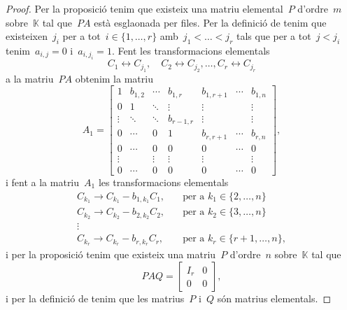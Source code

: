 \documentclass[../../main.tex]{subfiles}
\begin{document}
\begin{theorem}
\begin{proof}
            Per la proposició  tenim que existeix una matriu elemental~\(P\) d'ordre~\(m\) sobre~\(\mathbb{K}\) tal que~\(PA\) està esglaonada per files.
            Per la definició de  tenim que existeixen~\(j_{i}\) per a tot~\(i\in\{1,\dots,r\}\) amb~\(j_{1}<\dots<j_{r}\) tals que per a tot~\(j<j_{i}\) tenim~\(a_{i,j}=0\) i~\(a_{i,j_{i}}=1\).
            Fent les transformacions elementals
            \[
                C_{1}\leftrightarrow C_{j_{1}},\quad C_{2}\leftrightarrow C_{j_{2}},\dots,C_{r}\leftrightarrow C_{j_{r}}
            \]
            a la matriu~\(PA\) obtenim la matriu
            \[A_{1}=\left[\begin{array}{cccc|ccc}
            1 & b_{1,2} & \cdots & b_{1,r} & b_{1,r+1} & \cdots & b_{1,n} \\
            0 & 1 & \ddots & \vdots & \vdots & & \vdots\\
            \vdots & \ddots & \ddots & b_{r-1,r} & \vdots & & \vdots \\
            0 & \cdots & 0 & 1 & b_{r,r+1} & \cdots & b_{r,n} \\\hline
            0 & \cdots & 0 & 0 & 0 & \cdots & 0 \\
            \vdots & & \vdots & \vdots & \vdots & & \vdots \\
            0 & \cdots & 0 & 0 & 0 & \cdots & 0
            \end{array}\right],\]
            i fent a la matriu~\(A_{1}\) les transformacions elementals
            \begin{align*}
            C_{k_{1}}\rightarrow C_{k_{1}}-b_{1,k_{1}}C_{1},\quad&\text{per a }k_{1}\in\{2,\dots,n\} \\
            C_{k_{2}}\rightarrow C_{k_{2}}-b_{2,k_{2}}C_{2},\quad&\text{per a }k_{2}\in\{3,\dots,n\} \\
            \vdots & \\
            C_{k_{r}}\rightarrow C_{k_{r}}-b_{r,k_{r}}C_{r},\quad&\text{per a }k_{r}\in\{r+1,\dots,n\},
            \end{align*}
            i per la proposició  tenim que existeix una matriu~\(P\) d'ordre~\(n\) sobre~\(\mathbb{K}\) tal que
            \[PAQ=\left[\begin{array}{c|c}
            I_{r} & 0\\\hline
            0 & 0
            \end{array}\right],\]
            i per la definició de  tenim que les matrius~\(P\) i~\(Q\) són matrius elementals.


\end{proof}
\end{theorem}
\end{document}
